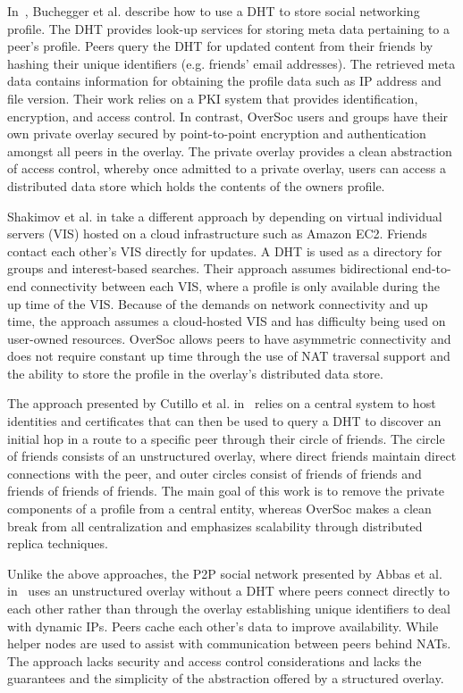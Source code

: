 \documentclass{IEEEtran}
\begin{document}
In~\cite{peerson}, Buchegger et al. describe how to use a DHT to store social
networking profile.  The DHT provides look-up services for storing meta data
pertaining to a peer's profile.  Peers query the DHT for updated content from
their friends by hashing their unique identifiers (e.g. friends' email
addresses).  The retrieved meta data contains information for obtaining the
profile data such as IP address and file version. Their work relies on a PKI
system that provides identification, encryption, and access control.  In
contrast, OverSoc users and groups have their own private overlay secured by
point-to-point encryption and authentication amongst all peers in the overlay.
The private overlay provides a clean abstraction of access control, whereby
once admitted to a private overlay, users can access a distributed data store
which holds the contents of the owners profile.

Shakimov et al. in \cite{vis-a-vis} take a different approach by depending on
virtual individual servers (VIS) hosted on a cloud infrastructure such as
Amazon EC2. Friends contact each other's VIS directly for updates.  A DHT is
used as a directory for groups and interest-based searches. Their approach
assumes bidirectional end-to-end connectivity between each VIS, where a profile
is only available during the up time of the VIS.  Because of the demands on
network connectivity and up time, the approach assumes a cloud-hosted VIS and
has difficulty being used on user-owned resources.  OverSoc allows peers to
have  asymmetric connectivity and does not require constant up time through the
use of NAT traversal support and the ability to store the profile in the
overlay's distributed data store.

The approach presented by Cutillo et al. in~\cite{matryoshka} relies on a
central system to host identities and certificates that can then be used to
query a DHT to discover an initial hop in a route to a specific peer through
their circle of friends.  The circle of friends consists of an unstructured
overlay, where direct friends maintain direct connections with the peer, and
outer circles consist of friends of friends and friends of friends of friends.
The main goal of this work is to remove the private components of a profile
from a central entity, whereas OverSoc makes a clean break from all
centralization and emphasizes scalability through distributed replica
techniques.

Unlike the above approaches, the P2P social network presented by Abbas et al.
in~\cite{tribler-osn} uses an unstructured overlay without a DHT where peers
connect directly to each other rather than through the overlay establishing
unique identifiers to deal with dynamic IPs.  Peers cache each other's data to
improve availability.  While helper nodes are used to assist with
communication between peers behind NATs.  The approach lacks security and
access control considerations and lacks the guarantees and the simplicity of
the abstraction offered by a structured overlay.
\end{document}
